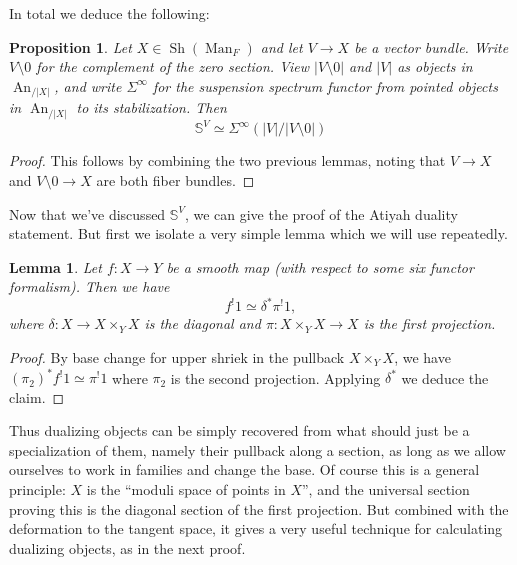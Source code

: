 \documentclass[12pt]{article}
\newtheorem{lemma}[theorem]{Lemma}
\newtheorem{proposition}[theorem]{Proposition}
\newcommand{\on}{\operatorname}
\begin{document}
In total we deduce the following:

\begin{proposition}\label{homotopytwists}
Let $X\in\on{Sh}(\on{Man}_F)$ and let $V\to X$ be a vector bundle.  Write $V\setminus 0$ for the complement of the zero section.  View $|V\setminus 0|$ and $|V|$ as objects in $\on{An}_{/|X|}$, and write $\Sigma^\infty$ for the suspension spectrum functor from pointed objects in $\on{An}_{/|X|}$ to its stabilization.  Then
$$\mathbb{S}^V \simeq \Sigma^\infty(|V|/|V\setminus 0|)$$
\end{proposition}
\begin{proof}
This follows by combining the two previous lemmas, noting that $V\to X$ and $V\setminus 0 \to X$ are both fiber bundles.
\end{proof}

Now that we've discussed $\mathbb{S}^V$, we can give the proof of the Atiyah duality statement.  But first we isolate a very simple lemma which we will use repeatedly.

\begin{lemma}\label{universalsection}
Let $f:X\to Y$ be a smooth map (with respect to some six functor formalism).  Then we have
$$f^!1 \simeq \delta^\ast \pi^! 1,$$
where $\delta: X\to X\times_YX$ is the diagonal and $\pi:X\times_YX\to X$ is the first projection.
\end{lemma}
\begin{proof}
By base change for upper shriek in the pullback $X\times_Y X$, we have $(\pi_2)^\ast f^!1 \simeq \pi^! 1$ where $\pi_2$ is the second projection.  Applying $\delta^\ast$ we deduce the claim.
\end{proof}

Thus dualizing objects can be simply recovered from what should just be a specialization of them, namely their pullback along a section, as long as we allow ourselves to work in families and change the base.  Of course this is a general principle: $X$ is the ``moduli space of points in $X$'', and the universal section proving this is the diagonal section of the first projection.  But combined with the deformation to the tangent space, it gives a very useful technique for calculating dualizing objects, as in the next proof.
\end{document}
